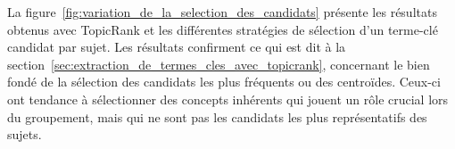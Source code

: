     La figure~\ref{fig:variation_de_la_selection_des_candidats} présente les
    résultats obtenus avec TopicRank et les différentes stratégies de sélection
    d'un terme-clé candidat par sujet. Les résultats confirment ce qui est dit
    à la section~\ref{sec:extraction_de_termes_cles_avec_topicrank}, concernant
    le bien fondé de la sélection des candidats les plus fréquents ou des
    centroïdes. Ceux-ci ont tendance à sélectionner des concepts inhérents qui
    jouent un rôle crucial lors du groupement, mais qui ne sont pas les
    candidats les plus représentatifs des sujets.
